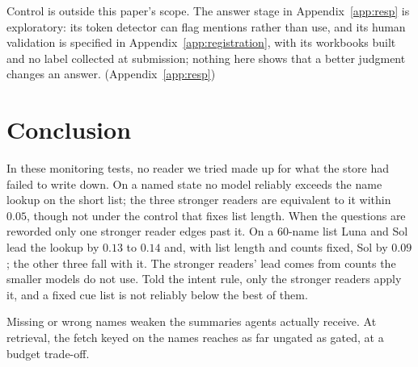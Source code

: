 \documentclass{article}
\begin{document}
Control is outside this paper's scope. The answer stage in Appendix~\ref{app:resp} is exploratory: its token detector can flag mentions rather than use, and its human validation is specified in Appendix~\ref{app:registration}, with its workbooks built and no label collected at submission; nothing here shows that a better judgment changes an answer. (Appendix~\ref{app:resp})

\section{Conclusion}\label{sec:conclusion}
In these monitoring tests, no reader we tried made up for what the store had failed to write down. On a named state no model reliably exceeds the name lookup on the short list; the three stronger readers are equivalent to it within $0.05$, though not under the control that fixes list length. When the questions are reworded only one stronger reader edges past it. On a $60$-name list Luna and Sol lead the lookup by $0.13$ to $0.14$ and, with list length and counts fixed, Sol by $0.09$; the other three fall with it. The stronger readers' lead comes from counts the smaller models do not use. Told the intent rule, only the stronger readers apply it, and a fixed cue list is not reliably below the best of them.

Missing or wrong names weaken the summaries agents actually receive. At retrieval, the fetch keyed on the names reaches as far ungated as gated, at a budget trade-off.

\begin{center}
\label{main-text-end}
\end{center}
\end{document}
